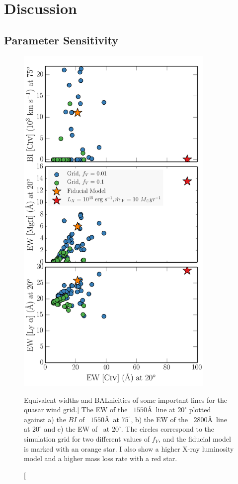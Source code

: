 \section{Discussion}
\label{sec:qso_discuss}

\subsection{Parameter Sensitivity}
\label{sec:param_sens}

\begin{figure}
\centering
\includegraphics[width=0.85\textwidth]
{figures/06-agnpaper/thesis_c4_grid.png}
\caption
[Equivalent widths and BALnicities of some important lines for the quasar wind grid.]
{
The EW of the \civ~$1550$\AA\ line at $20^\circ$ plotted against a) the 
$BI$ of \civ~$1550$\AA\ at $75^\circ$, b) the EW of the \mg~$2800$\AA\ line 
at $20^\circ$ and c) the EW of \la\ at $20^\circ$. The circles correspond 
to the simulation grid for two different values of $f_V$, and the fiducial 
model is marked with an orange star. 
I also show a higher X-ray luminosity model and a higher mass loss rate
with a red star.
}
\label{fig:grid}
\end{figure}

